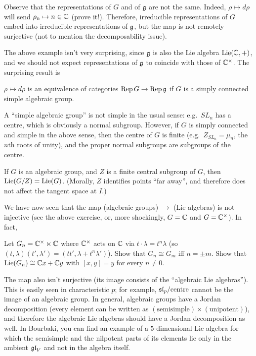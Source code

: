 Observe that the representations of $G$ and of $\g$ are not the same. Indeed,
$\rho \mapsto d\rho$ will send $\rho_n \mapsto n \in \C$ (prove it!).
Therefore, irreducible representations of $G$ embed into irreducible
representations of $\g$, but the map is not remotely surjective (not to
mention the decomposability issue).

The above example isn't very surprising, since $\g$ is also the Lie algebra
$\Lie(\C, +)$, and we should not expect representations of $\g$ to coincide
with those of $\C^\times$. The surprising result is

\begin{theorem}[Lie]
$\rho \mapsto d\rho$ is an equivalence of categories $\Rep G \to \Rep \g$ if
$G$ is a simply connected simple algebraic group.
\end{theorem}

\begin{remark}
A ``simple algebraic group'' is not simple in the usual sense: e.g.\ $SL_n$
has a centre, which is obviously a normal subgroup. However, if $G$ is simply
connected and simple in the above sense, then the centre of $G$ is finite
(e.g.\ $Z_{SL_n} = \mu_n$, the $n$th roots of unity), and the proper normal
subgroups are subgroups of the centre.
\end{remark}

\begin{exercise}
If $G$ is an algebraic group, and $Z$ is a finite central subgroup of $G$,
then $\Lie(G/Z) = \Lie(G)$. (Morally, $Z$ identifies points ``far away'', and
therefore does not affect the tangent space at $I$.)
\end{exercise}

We have now seen that the map (algebraic groups) $\to$ (Lie algebras) is not
injective (see the above exercise, or, more shockingly, $G = \C$ and
$G = \C^\times$). In fact,

\begin{exercise}
Let $G_n = \C^\times \ltimes \C$ where $\C^\times$ acts on $\C$ via
$t \cdot \lambda = t^n\lambda$ (so
$(t, \lambda)(t', \lambda') = (tt', \lambda + t^n\lambda')$). Show that
$G_n \cong G_m$ iff $n = \pm m$. Show that $\Lie(G_n) \cong \C x + \C y$ with
$[x, y] = y$ for every $n \neq 0$.
\end{exercise}

The map also isn't surjective (its image consists of the ``algebraic Lie
algebras''). This is easily seen in characteristic $p$; for example,
$\sl_p/\text{centre}$ cannot be the image of an algebraic group. In general,
algebraic groups have a Jordan decomposition (every element can be written as
$(\text{semisimple}) \times (\text{unipotent})$), and therefore the algebraic
Lie algebras should have a Jordan decomposition as well. In Bourbaki, you can
find an example of a $5$-dimensional Lie algebra for which the semisimple and
the nilpotent parts of its elements lie only in the ambient $\gl_V$ and not in
the algebra itself.
